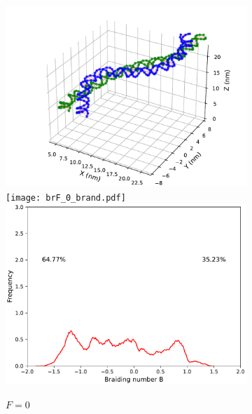 \documentclass[a4paper,10pt]{article}
\begin{document}
\begin{figure}[htbp]
\centering
\begin{subfigure}{.3\textwidth}
\includegraphics[width=\textwidth]{brF_0_2000000.pdf}
\texttt{[image: brF\_0\_brand.pdf]}
\includegraphics[width=\textwidth]{brF_0_br_pr.pdf}
\caption{$F=$\SI{0}{\pico\neuton}}
\label{fig:braF_a}
\end{subfigure}
\begin{subfigure}{.3\textwidth}

\end{subfigure}
\end{figure}
\end{document}
